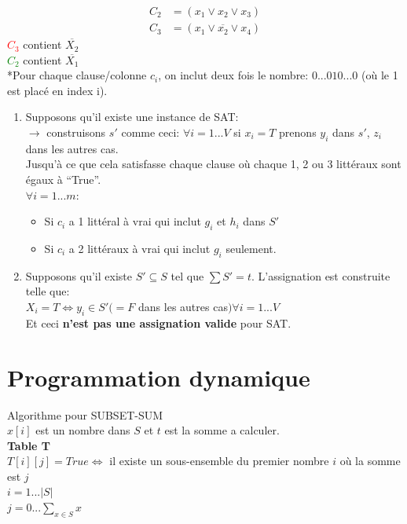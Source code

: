 \documentclass[a4paper,12pt]{article}
\begin{document}
    \begin{align*}
      C_2 &= (x_1 \vee x_2 \vee x_3)\\
      C_3 &= (x_1 \vee \overline{x_2} \vee x_4)
    \end{align*}
    \textcolor{red}{$C_3$} contient $\overline{X_2}$\\
    \textcolor{green}{$C_2$} contient $\overline{X_1}$\\

    *Pour chaque clause/colonne $c_i$, on inclut deux fois le nombre: $0...010...0$ (où le 1 est placé en index i).

    \begin{enumerate}
      \item Supposons qu'il existe une instance de SAT:\\
	  $\rightarrow$ construisons $s'$ comme ceci: $\forall i = 1 ... V$ si $x_i = T$ prenons $y_i$ dans $s'$, $z_i$ dans les autres cas.\\
	  Jusqu'à ce que cela satisfasse chaque clause où chaque 1, 2 ou 3 littéraux sont égaux à ``True''.\\
	  $\forall i = 1...m$:
	  \begin{itemize}
	    \item Si $c_i$ a 1 littéral à vrai qui inclut $g_i$ et $h_i$ dans $S'$
	    \item Si $c_i$ a 2 littéraux à vrai qui inclut $g_i$ seulement.
	  \end{itemize}
      \item Supposons qu'il existe $S' \subseteq S$ tel que $\sum S' = t$. L’assignation est construite telle que:\\
	  $X_i = T \Leftrightarrow y_i \in S' (= F$ dans les autres cas$) \forall i = 1 ... V$\\
	  Et ceci \textbf{n'est pas une assignation valide} pour SAT.
    \end{enumerate}


\section{Programmation dynamique}
  Algorithme pour SUBSET-SUM\\
  $x[i]$ est un nombre dans $S$ et $t$ est la somme a calculer.\\

  \textbf{Table T}\\
    $T[i][j] = True \Leftrightarrow$ il existe un sous-ensemble du premier nombre $i$ où la somme est $j$\\
    $i = 1 ... |S|$\\
    $j = 0 ... \sum_{x \in S}x$\\
\end{document}
